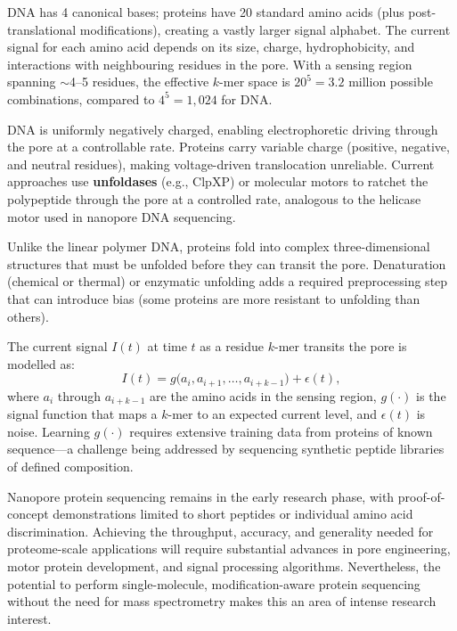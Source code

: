 \begin{description}[style=nextline, itemsep=3pt]
  \item[Alphabet complexity] DNA has 4 canonical bases; proteins have 20 standard amino acids (plus post-translational modifications), creating a vastly larger signal alphabet. The current signal for each amino acid depends on its size, charge, hydrophobicity, and interactions with neighbouring residues in the pore. With a sensing region spanning $\sim$4--5 residues, the effective $k$-mer space is $20^5 = 3.2$ million possible combinations, compared to $4^5 = 1{,}024$ for DNA.

  \item[Variable charge and translocation control] DNA is uniformly negatively charged, enabling electrophoretic driving through the pore at a controllable rate. Proteins carry variable charge (positive, negative, and neutral residues), making voltage-driven translocation unreliable. Current approaches use \textbf{unfoldases} (e.g., ClpXP) or molecular motors to ratchet the polypeptide through the pore at a controlled rate, analogous to the helicase motor used in nanopore DNA sequencing.

  \item[Protein unfolding] Unlike the linear polymer DNA, proteins fold into complex three-dimensional structures that must be unfolded before they can transit the pore. Denaturation (chemical or thermal) or enzymatic unfolding adds a required preprocessing step that can introduce bias (some proteins are more resistant to unfolding than others).

  \item[Signal modelling] The current signal $I(t)$ at time $t$ as a residue $k$-mer transits the pore is modelled as:
  \begin{equation}
    I(t) = g\bigl(a_{i}, a_{i+1}, \ldots, a_{i+k-1}\bigr) + \epsilon(t),
    \label{eq:emerging:nanopore-protein-signal}
  \end{equation}
  where $a_i$ through $a_{i+k-1}$ are the amino acids in the sensing region, $g(\cdot)$ is the signal function that maps a $k$-mer to an expected current level, and $\epsilon(t)$ is noise. Learning $g(\cdot)$ requires extensive training data from proteins of known sequence---a challenge being addressed by sequencing synthetic peptide libraries of defined composition.
\end{description}

\begin{warningbox}
Nanopore protein sequencing remains in the early research phase, with proof-of-concept demonstrations limited to short peptides or individual amino acid discrimination. Achieving the throughput, accuracy, and generality needed for proteome-scale applications will require substantial advances in pore engineering, motor protein development, and signal processing algorithms. Nevertheless, the potential to perform single-molecule, modification-aware protein sequencing without the need for mass spectrometry makes this an area of intense research interest.
\end{warningbox}

